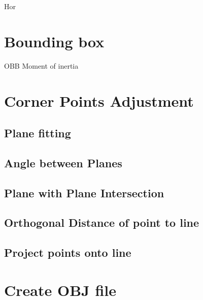 		Hor
		
	\section{Bounding box}
		OBB
		Moment of inertia
		
	\section{Corner Points Adjustment}
	
		\subsection{Plane fitting}
		
		\subsection{Angle between Planes}
		
		\subsection{Plane with Plane Intersection}
		
		\subsection{Orthogonal Distance of point to line}
		
		\subsection{Project points onto line}
		
	\section{Create OBJ file}
	
